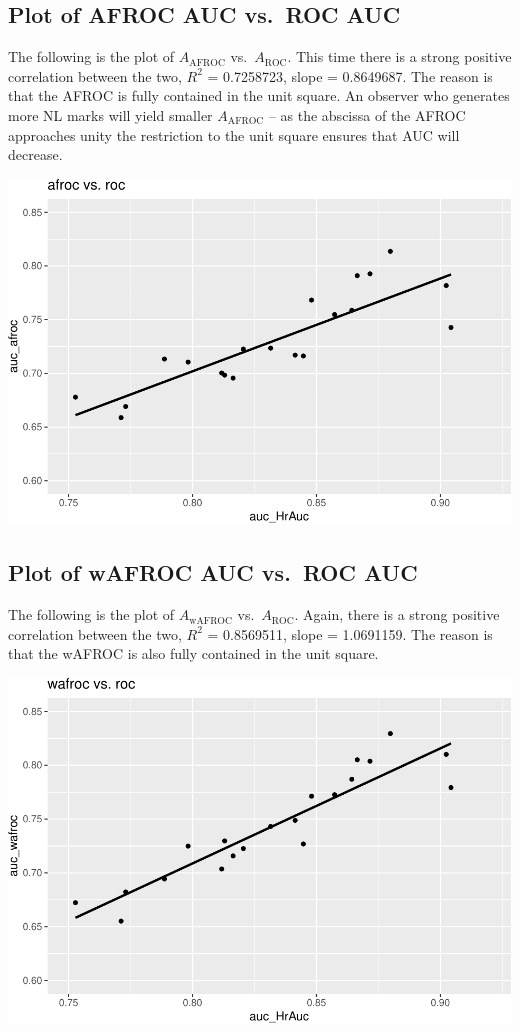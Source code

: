 \documentclass[
]{book}
\begin{document}
\hypertarget{plot-of-afroc-auc-vs.-roc-auc}{%
\subsection{Plot of AFROC AUC vs.~ROC AUC}\label{plot-of-afroc-auc-vs.-roc-auc}}

The following is the plot of \(A_{\text{AFROC}}\) vs.~\(A_{\text{ROC}}\). This time there is a strong positive correlation between the two, \(R^2\) = 0.7258723, slope = 0.8649687. The reason is that the AFROC is fully contained in the unit square. An observer who generates more NL marks will yield smaller \(A_{\text{AFROC}}\) -- as the abscissa of the AFROC approaches unity the restriction to the unit square ensures that AUC will decrease.

\includegraphics{03-empirical_files/figure-latex/unnamed-chunk-28-1.pdf}

\hypertarget{plot-of-wafroc-auc-vs.-roc-auc}{%
\subsection{Plot of wAFROC AUC vs.~ROC AUC}\label{plot-of-wafroc-auc-vs.-roc-auc}}

The following is the plot of \(A_{\text{wAFROC}}\) vs.~\(A_{\text{ROC}}\). Again, there is a strong positive correlation between the two, \(R^2\) = 0.8569511, slope = 1.0691159. The reason is that the wAFROC is also fully contained in the unit square.

\includegraphics{03-empirical_files/figure-latex/unnamed-chunk-30-1.pdf}
\end{document}
